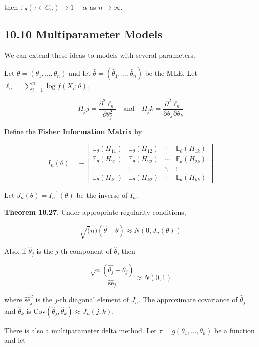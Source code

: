 then \(\mathbb{P}_\theta(\tau \in C_{n}) \rightarrow 1 - \alpha\) as
\(n \rightarrow \infty\).

\subsection*{10.10 Multiparameter Models}\label{multiparameter-models}

We can extend these ideas to models with several parameters.

Let \(\theta = (\theta_{1}, \dots, \theta_{n})\) and let
\(\hat{\theta} = (\hat{\theta}_{1}, \dots, \hat{\theta}_{n})\) be the MLE.
Let \(\ell_{n} = \sum_{i=1}^{n} \log f(X_{i}; \theta)\),

\[
H_{j}j = \frac{\partial^{2} \ell_{n}}{\partial \theta_{j}^{2}}
\quad \text{and} \quad
H_{j}k = \frac{\partial^{2} \ell_{n}}{\partial \theta_{j} \partial \theta_{k}}
\]

Define the \textbf{Fisher Information Matrix} by

\[
I_{n}(\theta) = -
\begin{bmatrix}
\mathbb{E}_\theta(H_{11}) & \mathbb{E}_\theta(H_{12}) & \cdots & \mathbb{E}_\theta(H_{1k}) \\
\mathbb{E}_\theta(H_{21}) & \mathbb{E}_\theta(H_{22}) & \cdots & \mathbb{E}_\theta(H_{2k}) \\
\vdots & \vdots & \ddots & \vdots \\
\mathbb{E}_\theta(H_{k1}) & \mathbb{E}_\theta(H_{k2}) & \cdots & \mathbb{E}_\theta(H_{kk})
\end{bmatrix}
\]

Let \(J_{n}(\theta) = I_{n}^{-1}(\theta)\) be the inverse of \(I_{n}\).

\textbf{Theorem 10.27}. Under appropriate regularity conditions,

\[ \sqrt(n)(\hat{\theta} - \theta) \approx N(0, J_{n}(\theta))\]

Also, if \(\hat{\theta}_{j}\) is the \(j\)-th component of
\(\hat{\theta}\), then

\[ \frac{\sqrt{n}(\hat{\theta_{j}} - \theta_{j})}{\hat{\text{se}}_{j}} \approx N(0, 1) \]

where \(\hat{\text{se}}_{j}^{2}\) is the \(j\)-th diagonal element of
\(J_{n}\). The approximate covariance of \(\hat{\theta}_{j}\) and
\(\hat{\theta}_{k}\) is
\(\text{Cov}(\hat{\theta}_{j}, \hat{\theta}_{k}) \approx J_{n}(j, k)\).

There is also a multiparameter delta method. Let
\(\tau = g(\theta_{1}, \dots, \theta_{k})\) be a function and let

